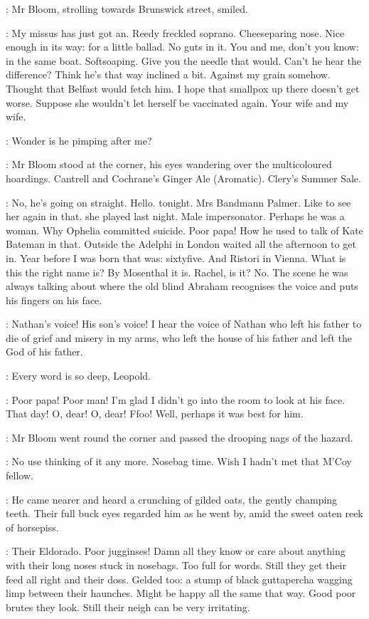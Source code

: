 :
Mr Bloom, strolling towards Brunswick street, smiled.

\BloomInt:
My missus has just got an.
Reedy freckled soprano.
Cheeseparing nose.
Nice enough in its way: for a little ballad.
No guts in it.
You and me, don't you know:
in the same boat.
Softsoaping.
Give you the needle that would.
Can't he hear the difference?
Think he's that way inclined a bit.
Against my grain somehow.
Thought that Belfast would fetch him.
I hope that smallpox up there doesn't get worse.
Suppose she wouldn't let herself be vaccinated again.
Your wife and my wife.

\BloomInt:
Wonder is he pimping after me?

:
Mr Bloom stood at the corner,
his eyes wandering over the multicoloured hoardings.
Cantrell and Cochrane's Ginger Ale (Aromatic).
Clery's Summer Sale.

\BloomInt:
No, he's going on straight.
Hello.
 tonight.
Mrs Bandmann Palmer.
Like to see her again in that.
 she played last night.
Male impersonator.
Perhaps he was a woman.
Why Ophelia committed suicide.
Poor papa!
How he used to talk of Kate Bateman in that.
Outside the Adelphi in London
waited all the afternoon to get in.
Year before I was born
that was:
sixtyfive.
And Ristori in Vienna.
What is this the right name is?
By Mosenthal it is.
Rachel, is it?
No.
The scene he was always talking about
where the old blind Abraham recognises the voice
and puts his fingers on his face.

\BloomInt:
Nathan's voice!
His son's voice!
I hear the voice of Nathan who left his father
to die of grief and misery in my arms,
who left the house of his father
and left the God of his father.

\virag:
Every word is so deep, Leopold.

\BloomInt:
Poor papa!
Poor man!
I'm glad I didn't go into the room to look at his face.
That day!
O, dear!
O, dear!
Ffoo!
Well, perhaps it was best for him.

:
Mr Bloom went round the corner
and passed the drooping nags of the hazard.

\BloomInt:
No use thinking of it any more.
Nosebag time.
Wish I hadn't met that M'Coy fellow.

:
He came nearer and heard a crunching of gilded oats,
the gently champing teeth.
Their full buck eyes regarded him as he went by,
amid the sweet oaten reek of horsepiss.

\BloomInt:
Their Eldorado.
Poor jugginses!
Damn all they know or care about anything
with their long noses stuck in nosebags.
Too full for words.
Still they get their feed all right and their doss.
Gelded too:
a stump of black guttapercha wagging limp between their haunches.
Might be happy all the same that way.
Good poor brutes they look.
Still their neigh can be very irritating.


